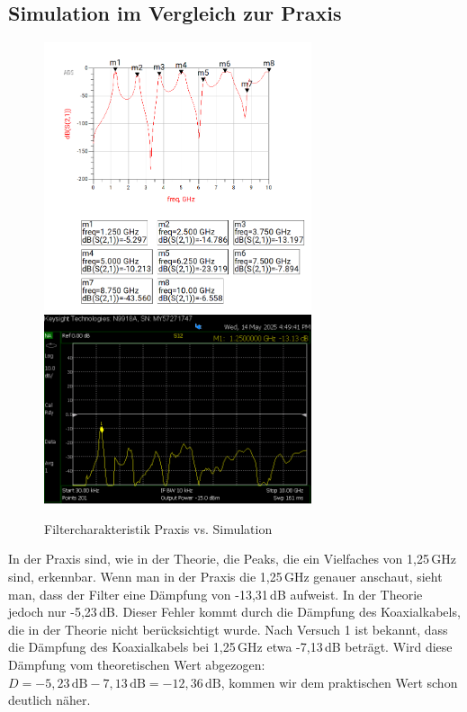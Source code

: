 \subsection{Simulation im Vergleich zur Praxis}
\begin{figure}[H]
    \includegraphics[width=0.7\textwidth]{Pictures/simulationmitmarkern32.8.png}
    \includegraphics[width=0.7\textwidth]{Pictures/S12neuCooleGrupp.png}
    \centering
    \caption{Filtercharakteristik Praxis vs. Simulation}
\end{figure}
In der Praxis sind, wie in der Theorie, die Peaks, die ein Vielfaches von 1,25\,GHz sind, erkennbar.
Wenn man in der Praxis die 1,25\,GHz genauer anschaut, sieht man, dass der Filter eine Dämpfung von -13,31\,dB
aufweist. In der Theorie jedoch nur -5,23\,dB. Dieser Fehler kommt durch die Dämpfung des Koaxialkabels,
die in der Theorie nicht berücksichtigt wurde.
Nach Versuch 1 ist bekannt, dass die Dämpfung des Koaxialkabels bei 1,25\,GHz etwa -7,13\,dB beträgt.
Wird diese Dämpfung vom theoretischen Wert abgezogen: $D=-5{,}23\,\mathrm{dB}-7{,}13\,\mathrm{dB}=-12{,}36\,\mathrm{dB}$,
kommen wir dem praktischen Wert schon deutlich näher.
     




